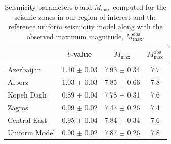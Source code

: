 \begin{table}[t]
    \centering
    \caption{Seismicity parameters $b$ and $M_{\max}$ computed for the seismic zones in our region of interest and the reference uniform seismicity model along with the observed maximum magnitude, $M_{\max}^{\mathrm{obs}}$.}
    \begin{tabular}{@{\hspace{0.2ex}}lccc@{\hspace{0.2ex}}}
        \cline{2-4}                                                                         \\[-1.6ex]
                        & $b$-value         & $M_{\max}$        & $M_{\max}^{\mathrm{obs}}$ \\[0.6ex]
        \hline                                                                              \\[-1.6ex]
        Azerbaijan      & 1.10 $\pm$ 0.03   & 7.93 $\pm$ 0.34   & 7.7                       \\
        Alborz          & 1.03 $\pm$ 0.03   & 7.85 $\pm$ 0.66   & 7.8                       \\
        Kopeh Dagh      & 0.89 $\pm$ 0.04   & 7.78 $\pm$ 0.31   & 7.6                       \\
        Zagros          & 0.99 $\pm$ 0.02   & 7.47 $\pm$ 0.26   & 7.4                       \\
        Central-East    & 0.95 $\pm$ 0.04   & 7.84 $\pm$ 0.34   & 7.6                       \\
        Uniform Model   & 0.90 $\pm$ 0.02   & 7.87 $\pm$ 0.26   & 7.8                       \\[0.5ex]
        \hline 
    \end{tabular}
    \label{tab:params} 
\end{table}



